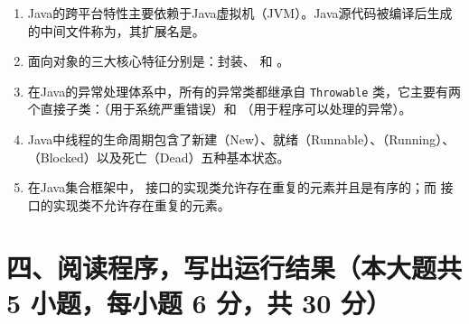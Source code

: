\documentclass[a3paper, landscape, 11pt, twocolumn]{article}
\begin{document}
\begin{enumerate}[label=\arabic*., itemsep=1em]
	\item Java的跨平台特性主要依赖于Java虚拟机（JVM）。Java源代码被编译后生成的中间文件称为\underline{\hspace{4cm}}，其扩展名是\underline{\hspace{3cm}}。

	\item 面向对象的三大核心特征分别是：封装、\underline{\hspace{4cm}} 和 \underline{\hspace{4cm}}。

	\item 在Java的异常处理体系中，所有的异常类都继承自 \texttt{Throwable} 类，它主要有两个直接子类：\underline{\hspace{4cm}}（用于系统严重错误）和 \underline{\hspace{4cm}}（用于程序可以处理的异常）。

	\item Java中线程的生命周期包含了新建（New）、就绪（Runnable）、\underline{\hspace{3cm}}（Running）、\underline{\hspace{3cm}}（Blocked）以及死亡（Dead）五种基本状态。

	\item 在Java集合框架中，\underline{\hspace{4cm}} 接口的实现类允许存在重复的元素并且是有序的；而 \underline{\hspace{4cm}} 接口的实现类不允许存在重复的元素。
\end{enumerate}


\section*{四、阅读程序，写出运行结果（本大题共 5 小题，每小题 6 分，共 30 分）}
\end{document}
